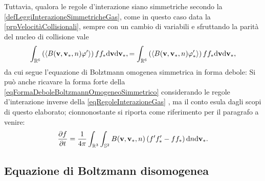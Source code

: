                 Tuttavia, qualora le regole d'interazione siano simmetriche secondo la \cref{defLeggiInterazioneSimmetricheGas}, come in questo caso data la \cref{prpVelocitàCollisionali}, sempre con un cambio di variabili e sfruttando la parità del nucleo di collisione vale
                \begin{equation*}
                    \int_{\mathbb R^6}\left(\left\langle
                        B(\mathbf v,\mathbf v_*,n)\varphi'
                    \right\rangle\right) ff_*\mathrm{d}\mathbf v\mathrm{d}\mathbf v_*,
                    =\int_{\mathbb R^6}\left(\left\langle
                        B(\mathbf v,\mathbf v_*,n)\varphi'_*
                    \right\rangle\right) ff_*\mathrm{d}\mathbf v\mathrm{d}\mathbf v_*,
                \end{equation*}
                da cui segue l'equazione di Bolztmann omogenea simmetrica in forma debole\footnotemark{}:%
                Si può anche ricavare la forma forte della \ref{eqFormaDeboleBoltzmannOmogeneoSimmetrico} considerando le regole d'interazione inverse della \ref{eqRegoleInterazioneGas} \cite[§ 2.5, p. 15]{Loy2025EKTMAS}, ma il conto esula dagli scopi di questo elaborato; cionnonostante si riporta come riferimento per il paragrafo a venire:
                \begin{equation}
                    \label{eqFormaForteBoltzmannOmogeneoSimmetrico}
                    \frac{\partial f}{\partial t}=\frac1{4\pi}\int_{\mathbb R^3}\int_{\mathbb S^2}
                    B(\mathbf v,\mathbf v_*,n)\left(f'f'_*-ff_*\right)\mathrm{d} n\mathrm{d}\mathbf v_*.
                \end{equation}

        \subsection{Equazione di Boltzmann disomogenea}\label{secBoltzmannDisomogeno}

